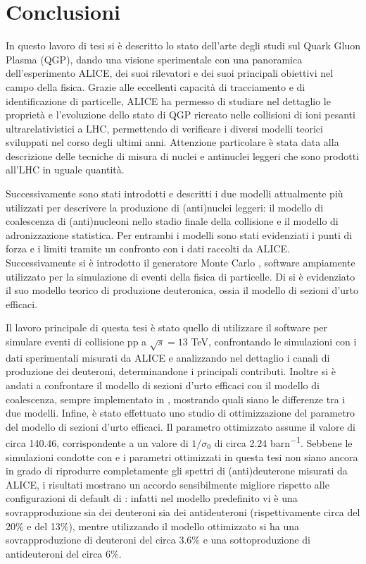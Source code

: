 \chapter*{Conclusioni}
In questo lavoro di tesi si è descritto lo stato dell'arte degli studi sul Quark Gluon Plasma (QGP), dando una visione sperimentale con una panoramica dell'esperimento ALICE, dei suoi rilevatori e dei suoi principali obiettivi nel campo della fisica.
Grazie alle eccellenti capacità di tracciamento e di identificazione di particelle, ALICE ha permesso di studiare nel dettaglio le proprietà e l'evoluzione dello stato di QGP ricreato nelle collisioni di ioni pesanti ultrarelativistici a LHC, permettendo di verificare i diversi modelli teorici sviluppati nel corso degli ultimi anni.
Attenzione particolare è stata data alla descrizione delle tecniche di misura di nuclei e antinuclei leggeri che sono prodotti all'LHC in uguale quantità.

Successivamente sono stati introdotti e descritti i due modelli attualmente più utilizzati per descrivere la produzione di (anti)nuclei leggeri: il modello di coalescenza di (anti)nucleoni nello stadio finale della collisione e il modello di adronizzazione statistica.
Per entrambi i modelli sono stati evidenziati i punti di forza e i limiti tramite un confronto con i dati raccolti da ALICE.
Successivamente si è introdotto il generatore Monte Carlo \pythiaa{}, software ampiamente utilizzato per la simulazione di eventi della fisica di particelle.
Di \pythiaa{} si è evidenziato il suo modello teorico di produzione deuteronica, ossia il modello di sezioni d'urto efficaci.

Il lavoro principale di questa tesi è stato quello di utilizzare il software \pythiaa{} per simulare eventi di collisione pp a $\sqrt{s} = 13$ TeV, confrontando le simulazioni con i dati sperimentali misurati da ALICE e analizzando nel dettaglio i canali di produzione dei deuteroni, determinandone i principali contributi.
Inoltre si è andati a confrontare il modello di sezioni d'urto efficaci con il modello di coalescenza, sempre implementato in \pythiaa{}, mostrando quali siano le differenze tra i due modelli.
Infine, è stato effettuato uno studio di ottimizzazione del parametro  del modello di sezioni d'urto efficaci.
Il parametro ottimizzato assume il valore di circa 140.46, corrispondente a un valore di $1/\sigma_0$ di circa 2.24 \si{barn^{-1}}.
Sebbene le simulazioni condotte con \pythiaa{} e i parametri ottimizzati in questa tesi non siano ancora in grado di riprodurre completamente gli spettri di (anti)deuterone misurati da ALICE, i risultati mostrano un accordo sensibilmente migliore rispetto alle configurazioni di default di \pythiaa{}:
infatti nel modello predefinito vi è una sovrapproduzione sia dei deuteroni sia dei antideuteroni (rispettivamente circa del 20\% e del 13\%), mentre utilizzando il modello ottimizzato si ha una sovrapproduzione di deuteroni del circa 3.6\% e una sottoproduzione di antideuteroni del circa 6\%.

